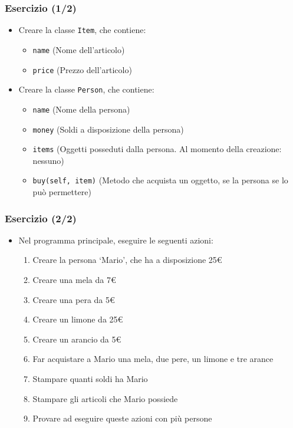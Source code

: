 \begin{exerciseframe}
    \frametitle{Esercizio (1/2)}

    \begin{itemize}
        \item Creare la classe \texttt{Item}, che contiene:
        \begin{itemize}
            \item \texttt{name} (Nome dell'articolo)
            \item \texttt{price} (Prezzo dell'articolo)
        \end{itemize}

        \bigskip
        \item Creare la classe \texttt{Person}, che contiene:
        \begin{itemize}
            \item \texttt{name} (Nome della persona)
            \item \texttt{money} (Soldi a disposizione della persona)
            \item \texttt{items} (Oggetti posseduti dalla persona. Al momento della creazione: nessuno)
            \item \texttt{buy(self, item)} (Metodo che acquista un oggetto, se la persona se lo può permettere)
        \end{itemize}
    \end{itemize}
\end{exerciseframe}

\begin{exerciseframe}
    \frametitle{Esercizio (2/2)}

    \begin{itemize}
        \item Nel programma principale, eseguire le seguenti azioni:
        \begin{enumerate}
            \item Creare la persona `Mario', che ha a disposizione 25€
            \item Creare una mela da 7€
            \item Creare una pera da 5€
            \item Creare un limone da 25€
            \item Creare un arancio da 5€
            \item Far acquistare a Mario una mela, due pere, un limone e tre arance
            \item Stampare quanti soldi ha Mario
            \item Stampare gli articoli che Mario possiede
            \pause
            \bigskip
            \item Provare ad eseguire queste azioni con più persone
        \end{enumerate}
    \end{itemize}
\end{exerciseframe}

